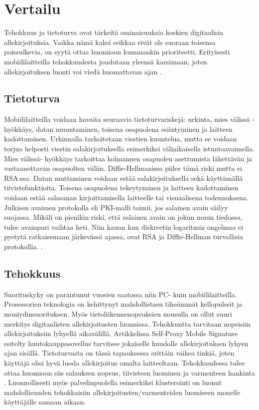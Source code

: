 \documentclass[finnish]{tktltiki2}
\theoremstyle{definition}
\theoremstyle{remark}
\begin{document}
\section{Vertailu}

Tehokkuus ja tietoturva ovat tärkeitä ominaisuuksia koskien digitaalisia allekirjoituksia. Vaikka nämä kaksi seikkaa eivät ole suoraan toisensa poissulkevia, on syytä ottaa huomioon kummankin prioriteetti. Erityisesti mobiililaitteilla tehokkuudesta joudutaan yleensä karsimaan, joten allekirjoituksen luonti voi viedä huomattavan ajan \cite{proxy}. 

\subsection{Tietoturva}

Mobiililaitteilla voidaan havaita seuraavia tietoturvariskejä: urkinta, mies välissä -hyökkäys, datan muuntaminen, toisena osapuolena esiintyminen ja laitteen kadottaminen. Urkinnalla tarkoitetaan viestien kuuntelua, mutta se voidaan torjua helposti viestin salakirjoituksella esimerkiksi väliaikaisella istuntoavaimella. Mies välissä- hyökkäys tarkoittaa kolmannen osapuolen asettumista lähettävän ja vastaanottavan osapuolten väliin. Diffie-Hellmanissa piilee tämä riski mutta ei RSA:ssa. Datan muttaminen voidaan estää salakirjoituksella sekä käyttämällä tiivistefunktioita. Toisena osapuolena tekeytyminen ja laitteen kadottaminen voidaan estää salasanan kirjoittamisella laitteelle tai visuaalisena todennuksena.
	Julkisen avaimen protokolla eli PKI-malli toimii, jos salainen avain säilyy suojassa. Mikäli on pienikin riski, että salainen avain on jokun muun tiedossa, tulee avainpari vaihtaa heti. Niin kauan kun diskreetin logaritmin ongelmaa ei pystytä ratkaisemaan järkevässä ajassa, ovat RSA ja Diffie-Hellman turvallisia protokollia. \cite{enti}.
	  

\subsection{Tehokkuus}

Suorituskyky on parantunut vuosien saatossa niin PC- kuin mobiililaitteilla. Prosessorien teknologia on kehittynyt mahdollistaen tiheämmät kellopulssit ja moniydinsuorituksen. Myös tietoliikennenopeuksien nousulla on ollut suuri merkitys digitaalisten allekirjoitusten luonnissa. Tehokkuutta tarvitaan nopeisiin allekirjoituksiin lyhyellä aikavälillä. Artikkelissa Self-Proxy Mobile Signature esitelty huutokauppasovellus tarvitsee jokaiselle huudolle allekirjoituksen lyhyen ajan sisällä. Tietoturvasta on tässä tapauksessa erittäin vaikea tinkiä, joten käyttäjä olisi hyvä luoda allekirjoitus omalta laitteeltaan. Tehokkuudessa tulee ottaa huomioon siis salauksen nopeus, tiivisteen luominen ja varmenteen hankinta \cite{proxy}. Luonnollisesti myös palvelinpuolella esimerkiksi klusterointi on luonut mahdollisuuden tehokkaisiin allekirjoitusten/varmenteiden luomiseen monelle käyttäjälle samaan aikaan.
\end{document}
